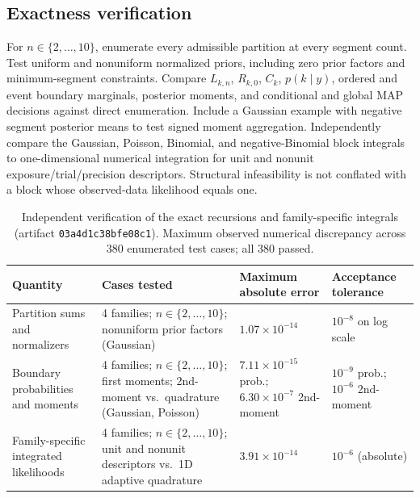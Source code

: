 \subsection{Exactness verification}
For $n\in\{2,\ldots,10\}$, enumerate every admissible partition at every
segment count. Test uniform and nonuniform normalized priors, including zero
prior factors and minimum-segment constraints. Compare $L_{k,n}$, $R_{k,0}$,
$C_k$, $p(k\mid y)$, ordered and event boundary marginals, posterior moments,
and conditional and global MAP decisions against direct enumeration. Include a
Gaussian example with negative segment posterior means to test signed moment
aggregation. Independently compare the Gaussian, Poisson, Binomial, and
negative-Binomial block integrals to one-dimensional numerical integration for
unit and nonunit exposure/trial/precision descriptors. Structural infeasibility
is not conflated with a block whose observed-data likelihood equals one.

\begin{table}[!htbp]
\centering\small
\caption{Independent verification of the exact recursions and family-specific integrals
(artifact \texttt{03a4d1c38bfe08c1}). Maximum observed numerical discrepancy across
380 enumerated test cases; all 380 passed.}
\label{tab:planned-oracles-paper}
\begin{tabularx}{0.88\textwidth}{@{}Y L{0.17\textwidth}L{0.17\textwidth}L{0.19\textwidth}@{}}
\toprule
Quantity & Cases tested & Maximum absolute error & Acceptance tolerance \\
\midrule
Partition sums and normalizers & 4 families; $n\in\{2,\ldots,10\}$; nonuniform prior factors (Gaussian) & $1.07\times10^{-14}$ & $10^{-8}$ on log scale \\
Boundary probabilities and moments & 4 families; $n\in\{2,\ldots,10\}$; first moments; 2nd-moment vs.\ quadrature (Gaussian, Poisson) & $7.11\times10^{-15}$ prob.; $6.30\times10^{-7}$ 2nd-moment & $10^{-9}$ prob.; $10^{-6}$ 2nd-moment \\
Family-specific integrated likelihoods & 4 families; $n\in\{2,\ldots,10\}$; unit and nonunit descriptors vs.\ 1D adaptive quadrature & $3.91\times10^{-14}$ & $10^{-6}$ (absolute) \\
\bottomrule
\end{tabularx}
\end{table}

